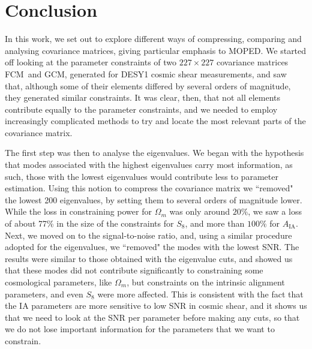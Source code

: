 \documentclass[twocolumn,nofootinbib]{\docclass}
\newcommand\full{FCM}
\newcommand\gaussian{GCM}
\begin{document}
	\section{Conclusion}
	\label{sec:conclusion}
	
	In this work, we set out to explore different ways of compressing, comparing and analysing covariance matrices, giving particular emphasis to MOPED. We started off looking at the parameter constraints of two $227 \times 227$ covariance matrices \full\ and \gaussian, generated for DESY1 cosmic shear measurements, and saw that, although some of their elements differed by several orders of magnitude, they generated similar constraints. It was clear, then, that not all elements contribute equally to the parameter constraints, and we needed to employ increasingly complicated methods to try and locate the most relevant parts of the covariance matrix.
	
	The first step was then to analyse the eigenvalues. We began with the hypothesis that modes associated with the highest eigenvalues carry most information, as such, those with the lowest eigenvalues would contribute less to parameter estimation. Using this notion to compress the covariance matrix we ``removed" the lowest 200 eigenvalues, by setting them to several orders of magnitude lower. While the loss in constraining power for $\Omega_m$ was only around $20\%$, we saw a loss of about 77\% in the size of the constraints for $S_8$, and more than $100\%$ for $A_{\mathrm{IA}}$. Next, we moved on to the signal-to-noise ratio, and, using a similar procedure adopted for the eigenvalues, we ``removed" the modes with the lowest SNR. The results were similar to those obtained with the eigenvalue cuts, and showed us that these modes did not contribute significantly to constraining some cosmological parameters, like $\Omega_m$, but constraints on the intrinsic alignment parameters, and even $S_8$ were more affected. This is consistent with the fact that the IA parameters are more sensitive to low SNR in cosmic shear, and it shows us that we need to look at the SNR per parameter before making any cuts, so that we do not lose important information for the parameters that we want to constrain.
	
\end{document}
